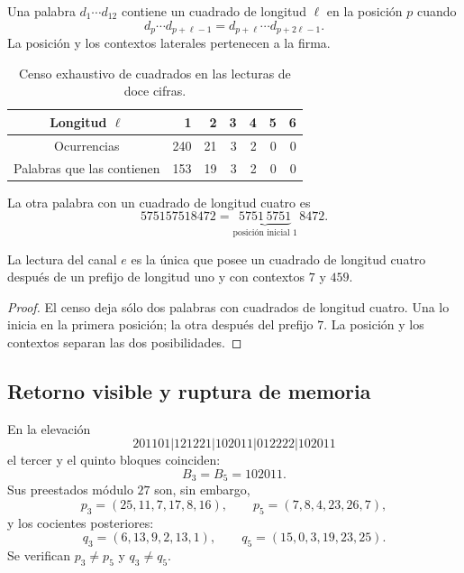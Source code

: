 \begin{definition}
Una palabra \(d_1\cdots d_{12}\) contiene un cuadrado de longitud \(\ell\)
en la posición \(p\) cuando
\[
 d_p\cdots d_{p+\ell-1}
 =d_{p+\ell}\cdots d_{p+2\ell-1}.
\]
La posición y los contextos laterales pertenecen a la firma.
\end{definition}

\begin{table}[htbp]
\centering
\caption{Censo exhaustivo de cuadrados en las lecturas de doce cifras.}
\label{p12-83-c9-s2:tab:censo-cuadrados-e}
\begin{tabular}{c*{6}{r}}
\toprule
Longitud \(\ell\)&1&2&3&4&5&6\\
\midrule
Ocurrencias&240&21&3&2&0&0\\
Palabras que las contienen&153&19&3&2&0&0\\
\bottomrule
\end{tabular}
\end{table}

La otra palabra con un cuadrado de longitud cuatro es
\[
 575157518472
 =\underbrace{5751\,5751}_{\text{posición inicial }1}\,8472.
\]

\begin{proposition}
\label{p12-83-c9-s2:prop:cuadrado-posicional-e}
La lectura del canal \(e\) es la única que posee un cuadrado de longitud
cuatro después de un prefijo de longitud uno y con contextos \(7\) y \(459\).
\end{proposition}

\begin{proof}
El censo deja sólo dos palabras con cuadrados de longitud cuatro. Una lo
inicia en la primera posición; la otra después del prefijo \(7\). La
posición y los contextos separan las dos posibilidades.
\end{proof}

\subsection{Retorno visible y ruptura de memoria}

En la elevación
\[
 201101|121221|102011|012222|102011
\]
el tercer y el quinto bloques coinciden:
\[
 B_3=B_5=102011.
\]
Sus preestados módulo \(27\) son, sin embargo,
\[
 p_3=(25,11,7,17,8,16),
 \qquad
 p_5=(7,8,4,23,26,7),
\]
y los cocientes posteriores:
\[
 q_3=(6,13,9,2,13,1),
 \qquad
 q_5=(15,0,3,19,23,25).
\]
Se verifican \(p_3\ne p_5\) y \(q_3\ne q_5\).


